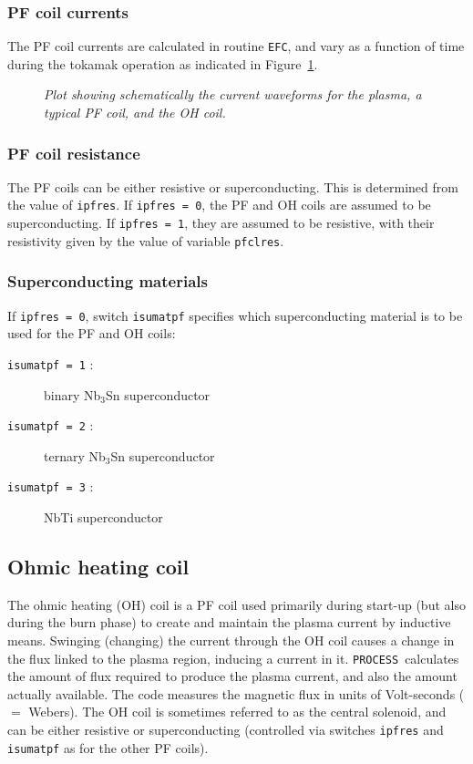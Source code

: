 \documentclass[11pt,a4paper]{report}
\newcommand{\process}{\mbox{\texttt{PROCESS}}}
\begin{document}
\subsubsection{PF coil currents}

The PF coil currents are calculated in routine \texttt{EFC}, and vary as a
function of time during the tokamak operation as indicated in
Figure~\ref{fig:current_vs_time}.

\begin{figure}[tbph]
\caption[Coil and plasma current waveforms]
{\label{fig:current_vs_time}
  \textit{Plot showing schematically the current waveforms for the plasma, a
    typical PF coil, and the OH coil.}
}
\end{figure}

\subsubsection{PF coil resistance}

The PF coils can be either resistive or superconducting. This is determined
from the value of \texttt{ipfres}. If \texttt{ipfres = 0}, the PF and OH coils
are assumed to be superconducting. If \texttt{ipfres = 1}, they are assumed to
be resistive, with their resistivity given by the value of variable
\texttt{pfclres}.

\subsubsection{Superconducting materials}

If \texttt{ipfres = 0}, switch \texttt{isumatpf} specifies which
superconducting material is to be used for the PF and OH coils:
\begin{description}
\item [\texttt{isumatpf = 1} :] binary Nb$_3$Sn superconductor
\item [\texttt{isumatpf = 2} :] ternary Nb$_3$Sn superconductor
\item [\texttt{isumatpf = 3} :] NbTi superconductor
\end{description}

\subsection{Ohmic heating coil}
\label{sec:ohcoil}

The ohmic heating (OH) coil is a PF coil used primarily during start-up (but
also during the burn phase) to create and maintain the plasma current by
inductive means. Swinging (changing) the current through the OH coil causes a
change in the flux linked to the plasma region, inducing a current in
it. \process\ calculates the amount of flux required to produce the plasma
current, and also the amount actually available. The code measures the
magnetic flux in units of Volt-seconds ($=$ Webers). The OH coil is sometimes
referred to as the central solenoid, and can be either resistive or
superconducting (controlled via switches \texttt{ipfres} and \texttt{isumatpf}
as for the other PF coils).
\end{document}
